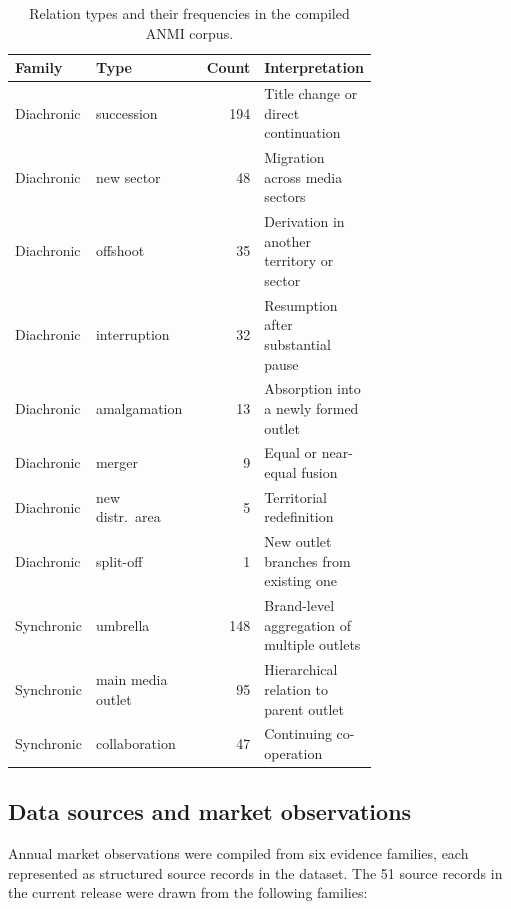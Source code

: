 \documentclass[11pt]{article}
\begin{document}
\begin{table}[t]
  \centering
  \small
  \begin{tabular}{>{\raggedright\arraybackslash}p{0.22\linewidth}>{\raggedright\arraybackslash}p{0.22\linewidth}r>{\raggedright\arraybackslash}p{0.28\linewidth}}
    \toprule
    Family & Type & Count & Interpretation \\
    \midrule
    Diachronic & succession & 194 & Title change or direct continuation \\
    Diachronic & new sector & 48 & Migration across media sectors \\
    Diachronic & offshoot & 35 & Derivation in another territory or sector \\
    Diachronic & interruption & 32 & Resumption after substantial pause \\
    Diachronic & amalgamation & 13 & Absorption into a newly formed outlet \\
    Diachronic & merger & 9 & Equal or near-equal fusion \\
    Diachronic & new distr.\ area & 5 & Territorial redefinition \\
    Diachronic & split-off & 1 & New outlet branches from existing one \\
    Synchronic & umbrella & 148 & Brand-level aggregation of multiple outlets \\
    Synchronic & main media outlet & 95 & Hierarchical relation to parent outlet \\
    Synchronic & collaboration & 47 & Continuing co-operation \\
    \bottomrule
  \end{tabular}
  \caption{Relation types and their frequencies in the compiled ANMI corpus.}
  \label{tab:relations}
\end{table}

\subsection{Data sources and market observations}

Annual market observations were compiled from six evidence families, each represented as structured source records in the dataset. The 51 source records in the current release were drawn from the following families:
\end{document}

